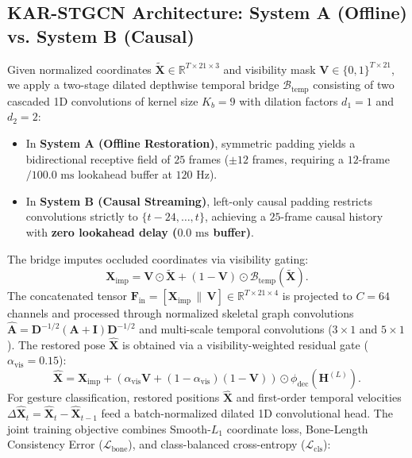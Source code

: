 \documentclass[10pt,twocolumn]{article}
\begin{document}
\subsection{KAR-STGCN Architecture: System A (Offline) vs. System B (Causal)}
Given normalized coordinates $\tilde{\mathbf{X}} \in \mathbb{R}^{T \times 21 \times 3}$ and visibility mask $\mathbf{V} \in \{0,1\}^{T \times 21}$, we apply a two-stage dilated depthwise temporal bridge $\mathcal{B}_{\text{temp}}$ consisting of two cascaded 1D convolutions of kernel size $K_b=9$ with dilation factors $d_1=1$ and $d_2=2$:
\begin{itemize}
    \item In \textbf{System A (Offline Restoration)}, symmetric padding yields a bidirectional receptive field of $25$ frames ($\pm 12$ frames, requiring a $12$-frame $/ 100.0\text{ ms}$ lookahead buffer at $120\text{ Hz}$).
    \item In \textbf{System B (Causal Streaming)}, left-only causal padding restricts convolutions strictly to $\{t-24, \dots, t\}$, achieving a $25$-frame causal history with \textbf{zero lookahead delay ($0.0\text{ ms}$ buffer)}.
\end{itemize}
The bridge imputes occluded coordinates via visibility gating:
\begin{equation}
    \mathbf{X}_{\text{imp}} = \mathbf{V} \odot \tilde{\mathbf{X}} + (1 - \mathbf{V}) \odot \mathcal{B}_{\text{temp}}(\tilde{\mathbf{X}}).
    \label{eq:bridge}
\end{equation}
The concatenated tensor $\mathbf{F}_{\text{in}} = [\mathbf{X}_{\text{imp}} \,\|\, \mathbf{V}] \in \mathbb{R}^{T \times 21 \times 4}$ is projected to $C=64$ channels and processed through normalized skeletal graph convolutions $\hat{\mathbf{A}} = \mathbf{D}^{-1/2}(\mathbf{A}+\mathbf{I})\mathbf{D}^{-1/2}$ \cite{yan2018spatial} and multi-scale temporal convolutions ($3\times 1$ and $5\times 1$). The restored pose $\hat{\mathbf{X}}$ is obtained via a visibility-weighted residual gate ($\alpha_{\text{vis}}=0.15$):
\begin{equation}
    \hat{\mathbf{X}} = \mathbf{X}_{\text{imp}} + \left(\alpha_{\text{vis}}\mathbf{V} + (1-\alpha_{\text{vis}})(1-\mathbf{V})\right) \odot \phi_{\text{dec}}(\mathbf{H}^{(L)}).
    \label{eq:gate}
\end{equation}
For gesture classification, restored positions $\hat{\mathbf{X}}$ and first-order temporal velocities $\Delta\hat{\mathbf{X}}_t = \hat{\mathbf{X}}_t - \hat{\mathbf{X}}_{t-1}$ feed a batch-normalized dilated 1D convolutional head. The joint training objective combines Smooth-$L_1$ coordinate loss, Bone-Length Consistency Error ($\mathcal{L}_{\text{bone}}$), and class-balanced cross-entropy ($\mathcal{L}_{\text{cls}}$):
\end{document}
